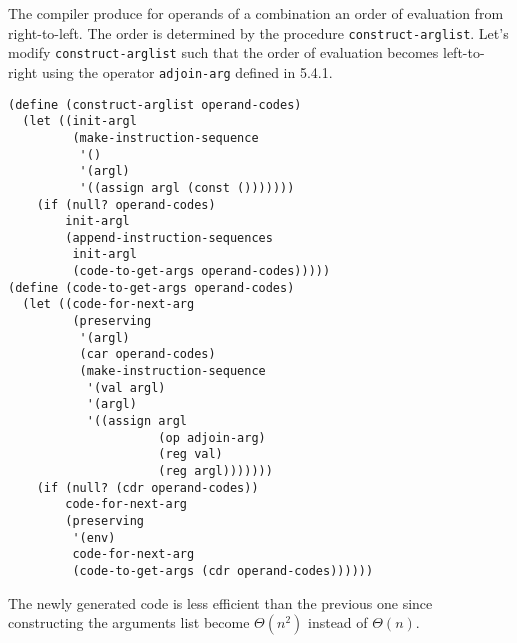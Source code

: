 \documentclass[a4paper,12pt]{article}
\begin{document}
The compiler produce for operands of a combination an order of
evaluation from right-to-left.  The order is determined by the
procedure \lstinline!construct-arglist!.  Let's modify
\lstinline!construct-arglist! such that the order of evaluation
becomes left-to-right using the operator \lstinline!adjoin-arg!
defined in 5.4.1.

\begin{lstlisting}
(define (construct-arglist operand-codes)
  (let ((init-argl
         (make-instruction-sequence
          '()
          '(argl)
          '((assign argl (const ()))))))
    (if (null? operand-codes)
        init-argl
        (append-instruction-sequences
         init-argl
         (code-to-get-args operand-codes)))))
(define (code-to-get-args operand-codes)
  (let ((code-for-next-arg
         (preserving
          '(argl)
          (car operand-codes)
          (make-instruction-sequence
           '(val argl)
           '(argl)
           '((assign argl
                     (op adjoin-arg)
                     (reg val)
                     (reg argl)))))))
    (if (null? (cdr operand-codes))
        code-for-next-arg
        (preserving
         '(env)
         code-for-next-arg
         (code-to-get-args (cdr operand-codes))))))
\end{lstlisting}

The newly generated code is less efficient than the previous one since
constructing  the arguments list become $\Theta(n^2)$ instead of
$\Theta(n)$.
\end{document}
